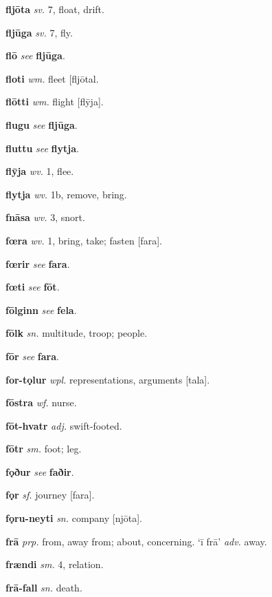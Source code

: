 \documentclass[12pt,letterpaper]{book}
\begin{document}
\noindent
\textbf{fljōta} \textit{sv.} 7, float, drift.

\noindent
\textbf{fljūga} \textit{sv.} 7, fly.

\noindent
\textbf{flō} \textit{} \textit{see} \textbf{fljūga}.

\noindent
\textbf{floti} \textit{wm.} fleet [fljōtal.

\noindent
\textbf{flōtti} \textit{wm.} flight [flȳja].

\noindent
\textbf{flugu} \textit{} \textit{see} \textbf{fljūga}.

\noindent
\textbf{fluttu} \textit{} \textit{see} \textbf{flytja}.

\noindent
\textbf{flȳja} \textit{wv.} 1, flee.

\noindent
\textbf{flytja} \textit{wv.} 1b, remove, bring.

\noindent
\textbf{fnāsa} \textit{wv.} 3, snort.

\noindent
\textbf{fœra} \textit{wv.} 1, bring, take; fasten [fara].

\noindent
\textbf{fœrir} \textit{} \textit{see} \textbf{fara}.

\noindent
\textbf{fœti} \textit{} \textit{see} \textbf{fōt}.

\noindent
\textbf{fōlginn} \textit{} \textit{see} \textbf{fela}.

\noindent
\textbf{fōlk} \textit{sn.} multitude, troop; people.

\noindent
\textbf{fōr} \textit{} \textit{see} \textbf{fara}.

\noindent
\textbf{for-tǫlur} \textit{wpl.} representations, arguments [tala].

\noindent
\textbf{fōstra} \textit{wf.} nurse.

\noindent
\textbf{fōt-hvatr} \textit{adj.} swift-footed.

\noindent
\textbf{fōtr} \textit{sm.} foot; leg.

\noindent
\textbf{fǫður} \textit{} \textit{see} \textbf{faðir}.

\noindent
\textbf{fǫr} \textit{sf.} journey [fara].

\noindent
\textbf{fǫru-neyti} \textit{sn.} company [njōta].

\noindent
\textbf{frā} \textit{prp.} from, away from; about, concerning.  `ī frā'
	\textit{adv.} away.

\noindent
\textbf{frændi} \textit{sm.} 4, relation.

\noindent
\textbf{frā-fall} \textit{sn.} death.
\end{document}
